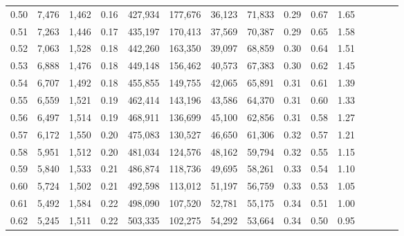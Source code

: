 \begin{tabular}{rrrcrrrrrrrrrrr}
0.50 &   7,476 &   1,462 &                                       0.16 &  427,934 &  177,676 &   36,123 &   71,833 &  0.29 &  0.67 &                         1.65 \\
0.51 &   7,263 &   1,446 &                                       0.17 &  435,197 &  170,413 &   37,569 &   70,387 &  0.29 &  0.65 &                         1.58 \\
0.52 &   7,063 &   1,528 &                                       0.18 &  442,260 &  163,350 &   39,097 &   68,859 &  0.30 &  0.64 &                         1.51 \\
0.53 &   6,888 &   1,476 &                                       0.18 &  449,148 &  156,462 &   40,573 &   67,383 &  0.30 &  0.62 &                         1.45 \\
0.54 &   6,707 &   1,492 &                                       0.18 &  455,855 &  149,755 &   42,065 &   65,891 &  0.31 &  0.61 &                         1.39 \\
0.55 &   6,559 &   1,521 &                                       0.19 &  462,414 &  143,196 &   43,586 &   64,370 &  0.31 &  0.60 &                         1.33 \\
0.56 &   6,497 &   1,514 &                                       0.19 &  468,911 &  136,699 &   45,100 &   62,856 &  0.31 &  0.58 &                         1.27 \\
0.57 &   6,172 &   1,550 &                                       0.20 &  475,083 &  130,527 &   46,650 &   61,306 &  0.32 &  0.57 &                         1.21 \\
0.58 &   5,951 &   1,512 &                                       0.20 &  481,034 &  124,576 &   48,162 &   59,794 &  0.32 &  0.55 &                         1.15 \\
0.59 &   5,840 &   1,533 &                                       0.21 &  486,874 &  118,736 &   49,695 &   58,261 &  0.33 &  0.54 &                         1.10 \\
0.60 &   5,724 &   1,502 &                                       0.21 &  492,598 &  113,012 &   51,197 &   56,759 &  0.33 &  0.53 &                         1.05 \\
0.61 &   5,492 &   1,584 &                                       0.22 &  498,090 &  107,520 &   52,781 &   55,175 &  0.34 &  0.51 &                         1.00 \\
0.62 &   5,245 &   1,511 &                                       0.22 &  503,335 &  102,275 &   54,292 &   53,664 &  0.34 &  0.50 &                         0.95 \\

\end{tabular}
